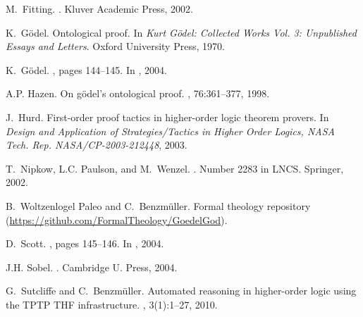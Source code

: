 \documentclass{llncs}
\begin{document}
\begin{thebibliography}{10}
M.~Fitting.
.
\newblock Kluver Academic Press, 2002.

K.~G\"odel.
\newblock Ontological proof.
\newblock In {\em {Kurt G\"odel: Collected Works Vol. 3: Unpublished Essays and
  Letters}}. Oxford University Press, 1970.

K.~G\"odel.
, pages 144--145.
\newblock In  \cite{sobel2004logic}, 2004.

A.P. Hazen.
\newblock On g\"odel's ontological proof.
, 76:361--377, 1998.

J.~Hurd.
\newblock First-order proof tactics in higher-order logic theorem provers.
\newblock In {\em Design and Application of Strategies/Tactics in Higher Order
  Logics, NASA Tech. Rep. NASA/CP-2003-212448}, 2003.

T.~Nipkow, L.C. Paulson, and M.~Wenzel.
.
\newblock Number 2283 in LNCS. Springer, 2002.

B.~Woltzenlogel Paleo and C.~Benzm\"uller.
\newblock Formal theology repository
  (\url{https://github.com/FormalTheology/GoedelGod}).

D.~Scott.
, pages 145--146.
\newblock In  \cite{sobel2004logic}, 2004.

J.H. Sobel.
.
\newblock Cambridge U. Press, 2004.

G.~Sutcliffe and C.~Benzm{\"u}ller.
\newblock Automated reasoning in higher-order logic using the {TPTP THF}
  infrastructure.
, 3(1):1--27, 2010.

\end{thebibliography}
\end{document}
